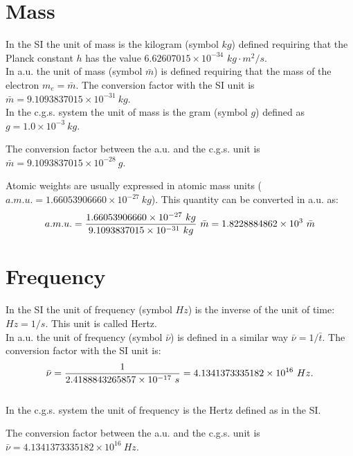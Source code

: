 \documentclass[12pt,a4paper]{article}
\def\hplanck{6.62607015\times 10^{-34}}
\def\amu{1.66053906660\times 10^{-27}}
\def\me{9.1093837015\times 10^{-31}}
\def\barm{9.1093837015\times 10^{-31}}
\def\bart{2.4188843265857\times 10^{-17}}
\def\barnu{4.1341373335182\times 10^{16}}
\def\gtokg{1.0\times 10^{-3}}
\def\barmcgs{9.1093837015\times 10^{-28}}
\def\amuau{1.8228884862\times 10^{3}}
\begin{document}
\newpage

\section{\color{coral}Mass}
In the SI the unit of mass is the kilogram (symbol $kg$) defined
requiring that the Planck constant $h$ has the value
$\hplanck$ $kg \cdot m^2 / s$. 
\\

{\color{web-blue} In a.u. the unit of mass (symbol $\bar m$) is defined
requiring that the mass of the electron $m_e= \bar m$. The conversion
factor with the SI unit is $\bar m = \me\ kg$.
}
\\

{\color{orange} In the c.g.s. system the unit of mass is the gram 
(symbol $g$) defined as $g =\gtokg\ kg$. 
\\
}

{\color{green} The conversion factor between the a.u. and the c.g.s. unit is
$\bar m=\barmcgs\ g$.
\\
}

{\color{red} Atomic weights are usually expressed in atomic mass units
($a.m.u.=\amu\ kg$). This quantity can be converted in a.u. as:
\begin{equation}
a.m.u. = {\amu\ kg \over \barm\ kg }\ \bar m=\amuau\ \bar m
\end{equation}
}


\newpage
\section{\color{coral}Frequency}

In the SI the unit of frequency (symbol $Hz$) is the inverse
of the unit of time: $Hz=1/s$. This unit is called Hertz.
\\

{\color{web-blue} In a.u. the unit of frequency (symbol $\bar \nu$) is defined
in a similar way $\bar \nu= 1/\bar t$. The conversion factor with the 
SI unit is:
\begin{equation}
\bar \nu = {1 \over \bart\ s}=\barnu\ Hz.
\end{equation}
}
\\

{\color{orange} In the c.g.s. system the unit of frequency is the Hertz 
defined as in the SI.
\\
}

{\color{green} The conversion factor between the a.u. and the c.g.s. unit is
$\bar \nu=\barnu\ Hz$.
\\
}
\end{document}
